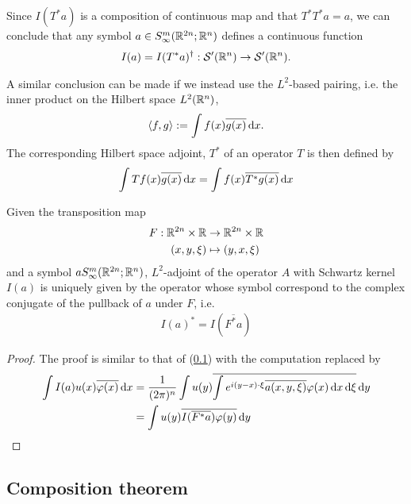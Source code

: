 \documentclass[12pt]{article}
\begin{document}
\begin{rem}
    Since $I(T^*a)$ is a composition of continuous map and that $T^* T^* a = a$, we can conclude that any symbol $a \in S^{m}_{\infty}(\R^{2n}; \R^{n})$ defines a continuous function 
    \begin{align*}
    I(a) = I(T^* a)^\dagger : \sch'(\R^n) \to \sch'(\R^n). 
    \end{align*}
\end{rem}


A similar conclusion can be made if we instead use the $L^2$-based pairing, i.e. the inner product on the Hilbert space $L^2(\R^n)$, 
\begin{align*}
\inprod[f, g] := \int f(x) \overline{g(x)} \d[x]. 
\end{align*}
The corresponding Hilbert space adjoint, $T^*$ of an operator $T$ is then defined by 
\begin{align*}
\int Tf(x) \overline{g(x)} \d[x] = \int f(x) \overline{T^* g(x)} \d[x]
\end{align*}


\begin{flemma}
    Given the transposition map 
    \begin{align*}
    F : \R^{2n} \times \R &\to \R^{2n} \times \R \\
    (x, y, \xi) &\mapsto (y, x, \xi)
    \end{align*}
    and a symbol $a S^{m}_{\infty}(\R^{2n}; \R^{n})$, $L^2$-adjoint of the operator $A$ with Schwartz kernel $I(a)$ is uniquely given by the operator whose symbol correspond to the complex conjugate of the pullback of $a$ under $F$, i.e. 
    \begin{align*}
    I(a)^* = I(\overline{F^*a})
    \end{align*}    
\end{flemma}
\begin{proof}
    The proof is similar to that of (\ref{}) with the computation replaced by 
    \begin{align*}
    \int I(a)u(x) \overline{\varphi(x)} \d[x] 
    & = \frac{1}{(2\pi)^n} \int u(y) \overline{\int e^{i (y - x) \cdot \xi} \overline{a(x, y, \xi)} \varphi(x) \d[x] \d[\xi] } \d[y]\\
    & = \int u(y) \overline{I(\overline{F^*a})\varphi(y)} \d[y]
    \end{align*}
\end{proof}


\subsection{Composition theorem}
\end{document}
